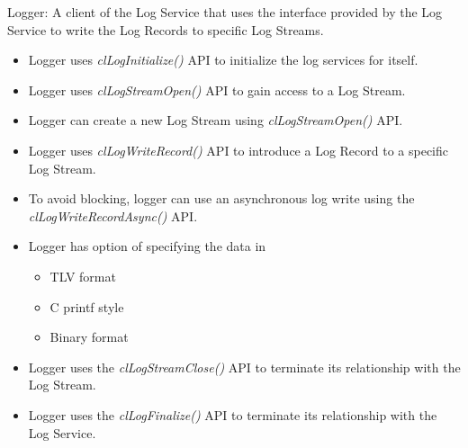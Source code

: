 \begin{flushleft}
\begin{Desc}
\item [Logger:] A client of the Log Service that uses the interface provided by the Log Service to write the Log Records to specific Log Streams.
\begin{itemize}
\item 	Logger uses \textit{clLogInitialize()} API to initialize the log services for itself.
\item	Logger uses \textit{clLogStreamOpen()} API to gain access to a Log Stream.
\item	Logger can create a new Log Stream using \textit{clLogStreamOpen()} API.
\item	Logger uses \textit{clLogWriteRecord()} API to introduce a Log Record to a specific Log Stream.
\item	To avoid blocking, logger can use an asynchronous log write using the \textit{clLogWriteRecordAsync()} API.
\item	Logger has option of specifying the data in
	\begin{itemize}
\item TLV format
\item	C printf style
\item	Binary format
\end{itemize}
\item	Logger uses the \textit{clLogStreamClose()} API to terminate its relationship with the Log Stream.
\item	Logger uses the \textit{clLogFinalize()} API to terminate its relationship with the Log Service.
\end{itemize}
\end{Desc}



\end{flushleft}

